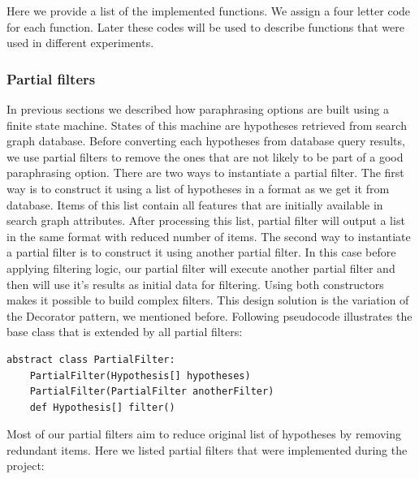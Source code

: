 Here we provide a list of the implemented functions. We assign a four letter code for each function. Later these codes will be used to describe functions that were used in different experiments.

\subsubsection{Partial filters}

In previous sections we described how paraphrasing options are built using a finite state machine. States of this machine are hypotheses retrieved from search graph database. Before converting each hypotheses from database query results, we use partial filters to remove the ones that are not likely to be part of a good paraphrasing option. There are two ways to instantiate a partial filter. The first way is to construct it using a list of hypotheses in a format as we get it from database. Items of this list contain all features that are initially available in search graph attributes. After processing this list, partial filter will output a list in the same format with reduced number of items. The second way to instantiate a partial filter is to construct it using another partial filter. In this case before applying filtering logic, our partial filter will execute another partial filter and then will use it's results as initial data for filtering. Using both constructors makes it possible to build complex filters. This design solution is the variation of the Decorator pattern, we mentioned before. Following pseudocode illustrates the base class that is extended by all partial filters: 

\begin{verbatim}
abstract class PartialFilter:
    PartialFilter(Hypothesis[] hypotheses)
    PartialFilter(PartialFilter anotherFilter)
    def Hypothesis[] filter()
\end{verbatim}


Most of our partial filters aim to reduce original list of hypotheses by removing redundant items. Here we listed partial filters that were implemented during the project:

